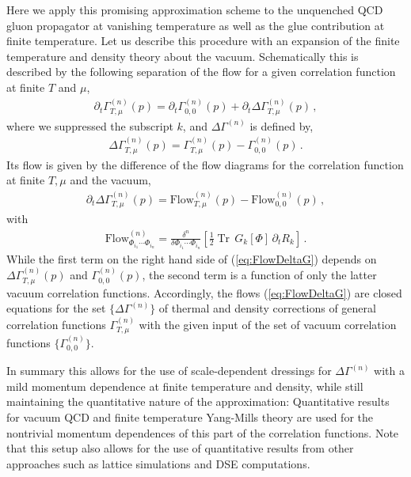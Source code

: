 \documentclass[%
reprint,
superscriptaddress,
showpacs,preprintnumbers,
 amsmath,amssymb,
 aps,
prd,
]{revtex4-1}
\newcommand{\Tr}{\ensuremath{\operatorname{Tr}}}
\def\eq#1{(\ref{#1})}
\begin{document}
Here we apply this promising approximation scheme to the unquenched
QCD gluon propagator at vanishing temperature as well as the glue
contribution at finite temperature. Let us describe this procedure
with an expansion of the finite temperature and density theory about
the vacuum. Schematically this is described by the following
separation of the flow for a given correlation function at finite $T$
and $\mu$,
%
\begin{align}\label{eq:DeltaGQCD}
  \partial_t \Gamma^{(n)}_{T,\mu}(p) = \partial_t
  \Gamma^{(n)}_{0,0}(p) +   \partial_t
  \Delta \Gamma^{(n)}_{T,\mu}(p) \,,
\end{align}
%
where we suppressed the subscript $k$, and $\Delta \Gamma^{(n)}$ is
defined by,
%
\begin{align}
  \label{eq:DeltaG}
  \Delta \Gamma^{(n)}_{T,\mu}(p) =  \Gamma^{(n)}_{T,\mu}(p) -
  \Gamma^{(n)}_{0,0}(p)  \,.
\end{align}
%
Its flow is given by the difference of the flow
diagrams for the correlation function at finite $T,\mu$ and the
vacuum,
%
\begin{align}\label{eq:FlowDeltaG}
  \partial_t  \Delta \Gamma^{(n)}_{T,\mu}(p) = \textrm{Flow}^{(n)}_{T,\mu}(p) -
  \textrm{Flow}^{(n)}_{0,0}(p) \,,
\end{align}
with
%
\begin{align}\label{eq:Flown}
  \textrm{Flow}^{(n)}_{\Phi_{i_1}\cdots\Phi_{i_n}}= \frac{\delta^n}{\delta \Phi_{i_1}\cdots
  \Phi_{i_n}}
  \left[\frac12 \Tr\, G_k[\Phi]\,\partial_t R_k\right] \,. 
\end{align}
While the first term on the right hand side of \eq{eq:FlowDeltaG}
depends on $ \Delta \Gamma^{(n)}_{T,\mu}(p) $ and
$\Gamma^{(n)}_{0,0}(p) $, the second term is a function of only the
latter vacuum correlation functions. Accordingly, the flows
\eq{eq:FlowDeltaG} are closed equations for the set
$\{\Delta\Gamma^{(n)}\}$ of thermal and density corrections of general
correlation functions $\Gamma^{(n)}_{T,\mu}$ with the given input of
the set of vacuum correlation functions $\{\Gamma^{(n)}_{0,0}\}$.

In summary this allows for the use of scale-dependent dressings for
$\Delta \Gamma^{(n)}$ with a mild momentum dependence at finite
temperature and density, while still maintaining the quantitative
nature of the approximation: Quantitative results for vacuum QCD and
finite temperature Yang-Mills theory \cite{Mitter:2014wpa,
  Cyrol:2016tym, Cyrol:2017ewj, Cyrol:2017qkl} are used for the
nontrivial momentum dependences of this part of the correlation
functions. Note that this setup also allows for the use of
quantitative results from other approaches such as lattice simulations
and DSE computations.
\end{document}
